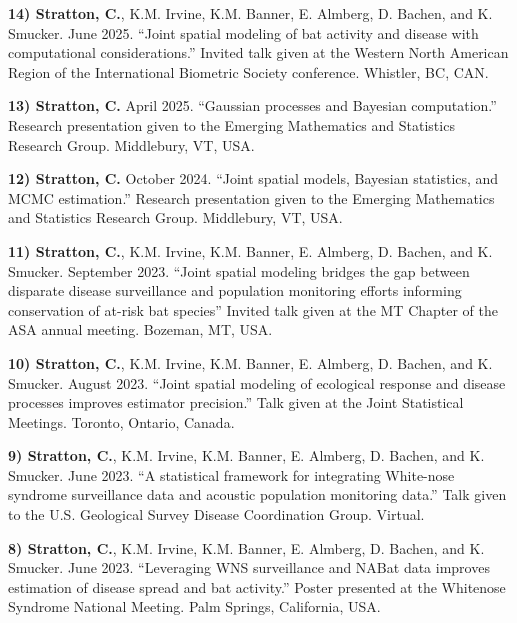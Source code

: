 \documentclass[a4paper]{article}
\begin{document}
\textbf{14) Stratton, C.}, K.M. Irvine, K.M. Banner, E. Almberg, D.
Bachen, and K. Smucker. June 2025. ``Joint spatial modeling of bat
activity and disease with computational considerations.'' Invited talk
given at the Western North American Region of the International
Biometric Society conference. Whistler, BC, CAN. \vspace*{2mm}

\textbf{13) Stratton, C.} April 2025. ``Gaussian processes and Bayesian
computation.'' Research presentation given to the Emerging Mathematics
and Statistics Research Group. Middlebury, VT, USA. \vspace*{2mm}

\textbf{12) Stratton, C.} October 2024. ``Joint spatial models, Bayesian
statistics, and MCMC estimation.'' Research presentation given to the
Emerging Mathematics and Statistics Research Group. Middlebury, VT, USA.
\vspace*{2mm}

\textbf{11) Stratton, C.}, K.M. Irvine, K.M. Banner, E. Almberg, D.
Bachen, and K. Smucker. September 2023. ``Joint spatial modeling bridges
the gap between disparate disease surveillance and population monitoring
efforts informing conservation of at-risk bat species'' Invited talk
given at the MT Chapter of the ASA annual meeting. Bozeman, MT, USA.
\vspace*{2mm}

\textbf{10) Stratton, C.}, K.M. Irvine, K.M. Banner, E. Almberg, D.
Bachen, and K. Smucker. August 2023. ``Joint spatial modeling of
ecological response and disease processes improves estimator
precision.'' Talk given at the Joint Statistical Meetings. Toronto,
Ontario, Canada. \vspace*{2mm}

\textbf{9) Stratton, C.}, K.M. Irvine, K.M. Banner, E. Almberg, D.
Bachen, and K. Smucker. June 2023. ``A statistical framework for
integrating White-nose syndrome surveillance data and acoustic
population monitoring data.'' Talk given to the U.S. Geological Survey
Disease Coordination Group. Virtual. \vspace*{2mm}

\textbf{8) Stratton, C.}, K.M. Irvine, K.M. Banner, E. Almberg, D.
Bachen, and K. Smucker. June 2023. ``Leveraging WNS surveillance and
NABat data improves estimation of disease spread and bat activity.''
Poster presented at the Whitenose Syndrome National Meeting. Palm
Springs, California, USA. \vspace*{2mm}
\end{document}
